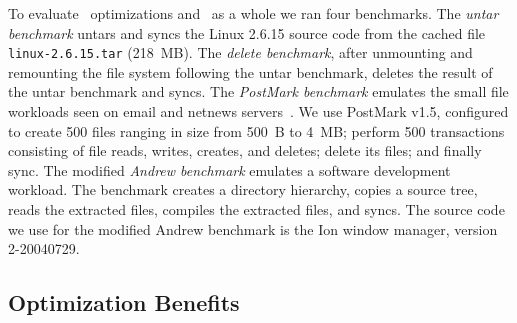 To evaluate \patch\ optimizations and \Kudos\ as a whole we ran four
benchmarks.
%
The \emph{untar benchmark} untars and syncs the Linux 2.6.15 source code
from the cached file \texttt{linux-2.6.15.tar} (218~MB).
%
The \emph{delete benchmark}, after unmounting and remounting the file
system following the untar benchmark, deletes the result of the untar
benchmark and syncs.
%
The \emph{PostMark benchmark} emulates the small file workloads seen
on email and netnews servers~\cite{postmark}. We use PostMark v1.5,
configured to create 500 files ranging in size from 500~B to 4~MB;
perform 500 transactions consisting of file reads, writes, creates,
and deletes; delete its files; and finally sync.
%
The modified \emph{Andrew benchmark} emulates a software development
workload.  The benchmark creates a directory hierarchy, copies a
source tree, reads the extracted files, compiles the extracted files,
and syncs. The source code we use for the modified Andrew benchmark is
the Ion window manager, version 2-20040729.

\subsection {Optimization Benefits}

